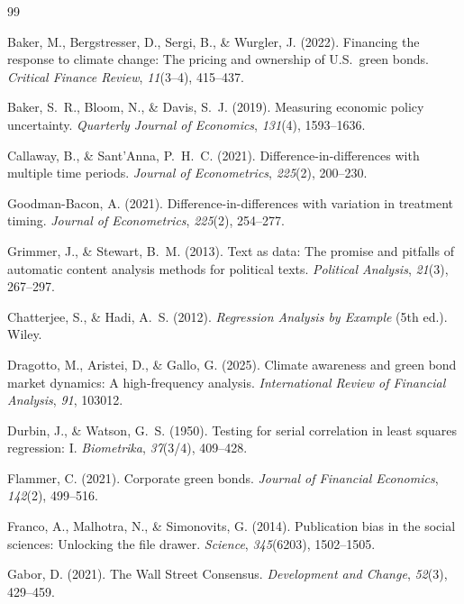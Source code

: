 \documentclass[12pt,a4paper]{article}
\begin{document}
\begin{thebibliography}{99}

Baker, M., Bergstresser, D., Sergi, B., \& Wurgler, J. (2022).
Financing the response to climate change: The pricing and ownership of U.S.\ green bonds.
\textit{Critical Finance Review}, \textit{11}(3--4), 415--437.

Baker, S.~R., Bloom, N., \& Davis, S.~J. (2019).
Measuring economic policy uncertainty.
\textit{Quarterly Journal of Economics}, \textit{131}(4), 1593--1636.

Callaway, B., \& Sant'Anna, P.~H.~C. (2021).
Difference-in-differences with multiple time periods.
\textit{Journal of Econometrics}, \textit{225}(2), 200--230.

Goodman-Bacon, A. (2021).
Difference-in-differences with variation in treatment timing.
\textit{Journal of Econometrics}, \textit{225}(2), 254--277.

Grimmer, J., \& Stewart, B.~M. (2013).
Text as data: The promise and pitfalls of automatic content analysis methods for political texts.
\textit{Political Analysis}, \textit{21}(3), 267--297.

Chatterjee, S., \& Hadi, A.~S. (2012).
\textit{Regression Analysis by Example} (5th ed.).
Wiley.

Dragotto, M., Aristei, D., \& Gallo, G. (2025).
Climate awareness and green bond market dynamics: A high-frequency analysis.
\textit{International Review of Financial Analysis}, \textit{91}, 103012.

Durbin, J., \& Watson, G.~S. (1950).
Testing for serial correlation in least squares regression: I.
\textit{Biometrika}, \textit{37}(3/4), 409--428.

Flammer, C. (2021).
Corporate green bonds.
\textit{Journal of Financial Economics}, \textit{142}(2), 499--516.

Franco, A., Malhotra, N., \& Simonovits, G. (2014).
Publication bias in the social sciences: Unlocking the file drawer.
\textit{Science}, \textit{345}(6203), 1502--1505.

Gabor, D. (2021).
The Wall Street Consensus.
\textit{Development and Change}, \textit{52}(3), 429--459.


\end{thebibliography}
\end{document}
